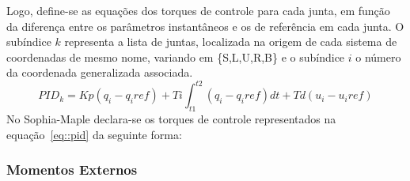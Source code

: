 Logo, define-se as equações dos torques de controle para cada junta, em função
da diferença entre os parâmetros instantâneos e os de referência em cada junta.
O subíndice $k$ representa a lista de juntas, localizada na origem de cada
sistema de coordenadas de mesmo nome, variando em \{S,L,U,R,B\} e o
subíndice $i$ o número da coordenada generalizada associada.
%
\begin{equation}
	PID_{k} = Kp(q_i-q_i{ref}) + Ti\int_{t1}^{t2} (q_i-q_i{ref})dt +
	Td(u_i-u_i{ref}) \label{eq::pid}
\end{equation}
%
No Sophia-Maple declara-se os torques de controle representados na
equação~\ref{eq::pid} da seguinte forma:

\medskip {}

\subsubsection{Momentos Externos}

